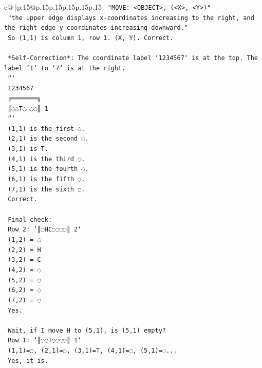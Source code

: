 \documentclass{article}
\begin{document}
{\begin{supertabular}{c@{$\;$}|p{.15\linewidth}@{}p{.15\linewidth}p{.15\linewidth}p{.15\linewidth}p{.15\linewidth}p{.15\linewidth}}
{{{\texttt{    "MOVE: <OBJECT>, (<X>, <Y>)"} \\
\texttt{    "the upper edge displays x{-}coordinates increasing to the right, and the right edge y{-}coordinates increasing downward."} \\
\texttt{    So (1,1) is column 1, row 1. (X, Y). Correct.} \\
\\ 
\texttt{    *Self{-}Correction*: The coordinate label `1234567` is at the top. The label `1` to `7` is at the right.} \\
\texttt{    ```} \\
\texttt{     1234567} \\
\texttt{    ╔═══════╗} \\
\texttt{    ║◌◌T◌◌◌◌║ 1} \\
\texttt{    ```} \\
\texttt{    (1,1) is the first ◌.} \\
\texttt{    (2,1) is the second ◌.} \\
\texttt{    (3,1) is T.} \\
\texttt{    (4,1) is the third ◌.} \\
\texttt{    (5,1) is the fourth ◌.} \\
\texttt{    (6,1) is the fifth ◌.} \\
\texttt{    (7,1) is the sixth ◌.} \\
\texttt{    Correct.} \\
\\ 
\texttt{    Final check:} \\
\texttt{    Row 2: `║◌HC◌◌◌◌║ 2`} \\
\texttt{    (1,2) = ◌} \\
\texttt{    (2,2) = H} \\
\texttt{    (3,2) = C} \\
\texttt{    (4,2) = ◌} \\
\texttt{    (5,2) = ◌} \\
\texttt{    (6,2) = ◌} \\
\texttt{    (7,2) = ◌} \\
\texttt{    Yes.} \\
\\ 
\texttt{    Wait, if I move H to (5,1), is (5,1) empty?} \\
\texttt{    Row 1: `║◌◌T◌◌◌◌║ 1`} \\
\texttt{    (1,1)=◌, (2,1)=◌, (3,1)=T, (4,1)=◌, (5,1)=◌...} \\
\texttt{    Yes, it is.} \\
\\ 
}}}
\end{supertabular}}
\end{document}

